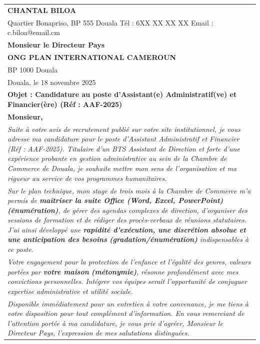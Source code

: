 \documentclass[11pt]{article}
\begin{document}
\begin{exoresolu}
    \begin{center}
    \begin{tabularx}{\linewidth}{|X|}\hline
    \textbf{CHANTAL BILOA} \\
    Quartier Bonapriso, BP 555 Douala \quad Tél : 6XX XX XX XX \quad Email : c.biloa@email.cm \\ \hline
    \textbf{Monsieur le Directeur Pays} \\
    \textbf{ONG PLAN INTERNATIONAL CAMEROUN} \\
    BP 1000 Douala \\ \hline
    \hfill Douala, le 18 novembre 2025 \\ \hline
    \textbf{Objet : Candidature au poste d'Assistant(e) Administratif(ve) et Financier(ère) (Réf : AAF-2025)} \\ \hline
    \textbf{Monsieur,} \\ \hline
    \textit{Suite à votre avis de recrutement publié sur votre site institutionnel, je vous adresse ma candidature pour le poste d'Assistant Administratif et Financier (Réf : AAF-2025). Titulaire d'un BTS Assistant de Direction et forte d'une expérience probante en gestion administrative au sein de la Chambre de Commerce de Douala, je souhaite mettre mon sens de l'organisation et ma rigueur au service de vos programmes humanitaires.} \\ \hline
    \textit{Sur le plan technique, mon stage de trois mois à la Chambre de Commerce m'a permis de \textbf{maîtriser la suite Office (Word, Excel, PowerPoint)} \textbf{(énumération)}, de gérer des agendas complexes de direction, d'organiser des sessions de formation et de rédiger des procès-verbaux de réunions statutaires. J'ai ainsi développé une \textbf{rapidité d'exécution, une discrétion absolue et une anticipation des besoins} \textbf{(gradation/énumération)} indispensables à ce poste.} \\ \hline
    \textit{Votre engagement pour la protection de l'enfance et l'égalité des genres, valeurs portées par \textbf{votre maison} \textbf{(métonymie)}, résonne profondément avec mes convictions personnelles. Intégrer vos équipes serait l'opportunité de conjuguer expertise administrative et utilité sociale.} \\ \hline
    \textit{Disponible immédiatement pour un entretien à votre convenance, je me tiens à votre disposition pour tout complément d'information. En vous remerciant de l'attention portée à ma candidature, je vous prie d'agréer, Monsieur le Directeur Pays, l'expression de mes salutations distinguées.} \\ \hline

\end{tabularx}
\end{center}
\end{exoresolu}
\end{document}
